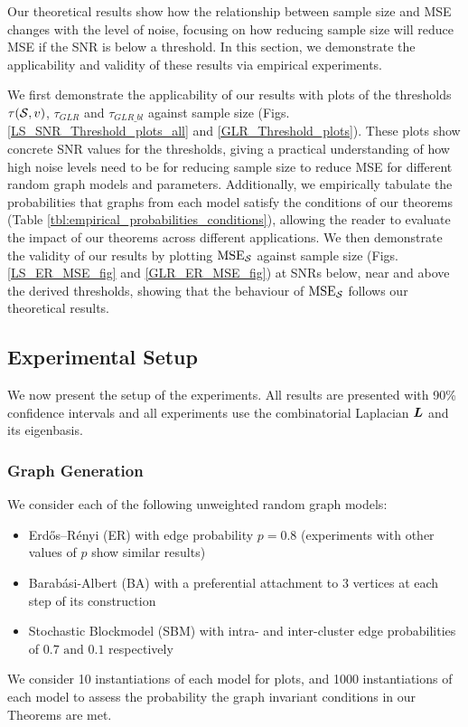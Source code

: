 Our theoretical results show how the relationship between sample size and MSE changes with the level of noise, focusing on how reducing sample size will reduce MSE if the SNR is below a threshold. In this section, we demonstrate  the applicability and validity of these results via empirical experiments. 


We first demonstrate the applicability of our results with plots of the thresholds $\tau(\mathcal{S},v)$, $\tau_{GLR}$ and $\tau_{GLR\_bl}$ against sample size (Figs. \ref{LS_SNR_Threshold_plots_all} and \ref{GLR_Threshold_plots}). These plots show concrete SNR values for the thresholds, giving a practical understanding of how high noise levels need to be for reducing sample size to reduce MSE for different random graph models and parameters. Additionally, we empirically tabulate the probabilities that graphs from each model  satisfy the conditions of our theorems (Table \ref{tbl:empirical_probabilities_conditions}), allowing the reader to evaluate the impact of our theorems across different applications. We then demonstrate the validity of our results by plotting $\textrm{MSE}_{\mathcal{S}}$ against sample size (Figs. \ref{LS_ER_MSE_fig} and  \ref{GLR_ER_MSE_fig}) at SNRs below, near and above the derived thresholds, showing that the behaviour of $\textrm{MSE}_{\mathcal{S}}$ follows our theoretical results. 

\subsection{Experimental Setup}
We now present the setup of the experiments. All results are presented with 90\% confidence intervals and all experiments use the combinatorial Laplacian $\bm{L}$ and its eigenbasis.
\subsubsection{ Graph Generation}
We consider each of the following unweighted random graph models:
\begin{itemize}
    \item Erdős–Rényi (ER) with edge probability $p=0.8$ (experiments with other values of $p$ show similar results)
    \item Barabási-Albert (BA) with a preferential attachment to 3 vertices at each step of its construction
    \item Stochastic Blockmodel (SBM) with intra- and inter-cluster edge probabilities of $0.7 \text{ and }0.1$ respectively
\end{itemize}
We consider 10 instantiations of each model for plots, and 1000 instantiations of each model to assess the probability the graph invariant conditions in our Theorems are met.

